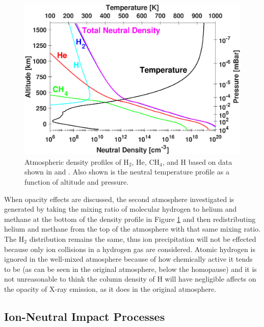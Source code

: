 \documentclass[draft]{agujournal2018}
\begin{document}
\begin{figure}[ht]
\centering
\includegraphics[width=\textwidth]{Figures/Atmosphere.eps}
\caption{Atmospheric density profiles of H$_{2}$, He, CH$_{4}$, and H based on data shown in \citet{maurellis2001} and \citet{sinclair2018}. Also shown is the neutral temperature profile as a function of altitude and pressure.}
\label{fig:atm}
\end{figure}

When opacity effects are discussed, the second atmosphere investigated is generated by taking the mixing ratio of molecular hydrogen to helium and methane at the bottom of the density profile in Figure \ref{fig:atm} and then redistributing helium and methane from the top of the atmosphere with that same mixing ratio.
The H$_{2}$ distribution remains the same, thus ion precipitation will not be effected because only ion collisions in a hydrogen gas are considered.
Atomic hydrogen is ignored in the well-mixed atmosphere because of how chemically active it tends to be (as can be seen in the original atmosphere, below the homopause) and it is not unreasonable to think the column density of H will have negligible affects on the opacity of X-ray emission, as it does in the original atmosphere.

\subsection{Ion-Neutral Impact Processes}
\end{document}
